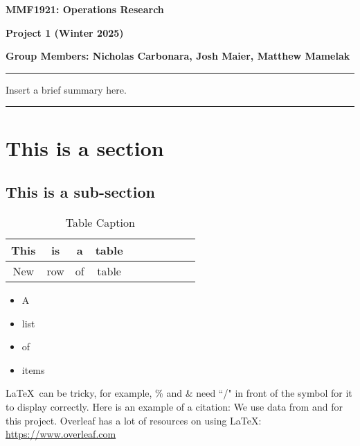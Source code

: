 \documentclass[10pt]{article}
\begin{document}
{\centering \textbf{\Large{MMF1921: Operations Research}} \par\vspace*{0.15cm}
\textbf{\large{Project 1 (Winter 2025)}}\par\vspace*{0.15cm}
\textbf{Group Members: Nicholas Carbonara, Josh Maier, Matthew Mamelak\centering}\par 
}
\vspace*{0.2cm}
\hrule
\vspace*{0.2cm}

Insert a brief summary here.
\vspace*{0.1cm}
\hrule
\vspace*{0.1cm}

\section{This is a section}

\subsection{This is a sub-section}


\begin{table}[!htbp]
\footnotesize
\caption{Table Caption}
\centering
\begin{tabular}{c c c c c c c c c c}
\hline 
\rule{0pt}{3.5ex}This & is & a & table \\[1.5ex]
\hline\hline
\rule{0pt}{3.5ex}New & row & of & table \\[1.5ex]
\hline 
\end{tabular}
\label{tab:example}
\end{table}

\begin{itemize}
\itemsep -0.1em
    \item A
    \item list
    \item of
    \item items
\end{itemize}

\noindent \LaTeX \ can be tricky, for example, \% and \& need ``/" in front of the symbol for it to display correctly. Here is an example of a citation: We use data from \cite{French2016Data} and \cite{QuandlWIKI} for this project.
\newline
Overleaf has a lot of resources on using \LaTeX: \url{https://www.overleaf.com}

\printbibliography
\end{document}
